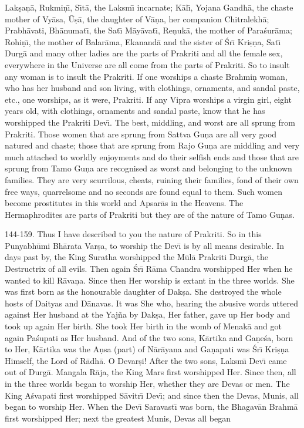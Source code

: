 Lak\d{s}a\d{n}\=a, Rukmi\d{n}\={\i}, S\={\i}t\=a, the Laksm\={\i} incarnate; K\=al\={\i}, Yojana Gandh\=a, the chaste mother of Vy\=asa, \=U\d{s}\=a, the daughter of V\=a\d{n}a, her companion Chitralekh\=a; Prabh\=avati, Bh\=anumat\={\i}, the Sat\={\i} M\=ay\=avat\={\i}, Re\d{n}uk\=a, the mother of Para\'sur\=ama; Rohi\d{n}\={\i}, the mother of Balar\=ama, Ekanand\=a and the sister of \'Sr\={\i} Kri\d{s}\d{n}a, Sat\={\i} Durg\=a and many other ladies are the parts of Prakriti and all the female sex, everywhere in the Universe are all come from the parts of Prakriti. So to insult any woman is to insult the Prakriti. If one worships a chaste Brahmi\d{n} woman, who has her husband and son living, with clothings, ornaments, and sandal paste, etc., one worships, as it were, Prakriti. If any Vipra worships a virgin girl, eight years old, with clothings, ornaments and sandal paste, know that he has worshipped the Prakriti Dev\={\i}. The best, middling, and worst are all sprung from Prakriti. Those women that are sprung from Sattva Gu\d{n}a are all very good natured and chaste; those that are sprung from Rajo Gu\d{n}a are middling and very much attached to worldly enjoyments and do their selfish ends and those that are sprung from Tamo Gu\d{n}a are recognised as worst and belonging to the unknown families. They are very scurrilous, cheats, ruining their families, fond of their own free ways, quarrelsome and no seconds are found equal to them. Such women become prostitutes in this world and Apsar\=as in the Heavens. The Hermaphrodites are parts of Prakriti but they are of the nature of Tamo Gu\d{n}as.

144-159. Thus I have described to you the nature of Prakriti. So in this Punyabh\=umi Bh\=arata Var\d{s}a, to worship the Dev\={\i} is by all means desirable. In days past by, the King Suratha worshipped the M\=ul\=a Prakriti Durg\=a, the Destructrix of all evils. Then again \'Sr\={\i} R\=ama Chandra worshipped Her when he wanted to kill R\=ava\d{n}a. Since then Her worship is extant in the three worlds. She was first born as the honourable daughter of Dak\d{s}a. She destroyed the whole hosts of Daityas and D\=anavas. It was She who, hearing the abusive words uttered against Her husband at the Yaj\~na by Dak\d{s}a, Her father, gave up Her body and took up again Her birth. She took Her birth in the womb of Menak\=a and got again Pa\'supati as Her husband. And of the two sons, K\=artika and Ga\d{n}e\'sa, born to Her, K\=artika was the A\d{n}sa (part) of N\=ar\=ayana and Ga\d{n}apati was \'Sr\={\i} Kri\d{s}\d{n}a Himself, the Lord of R\=adh\=a. O Devar\d{s}i! After the two sons, Laksm\={\i} Dev\={\i} came out of Durg\=a. Mangala R\=aja, the King Mars first worshipped Her. Since then, all in the three worlds began to worship Her, whether they are Devas or men. The King A\'svapati first worshipped S\=avitr\={\i} Dev\={\i}; and since then the Devas, Munis, all began to worship Her. When the Dev\={\i} Saravast\={\i} was born, the Bhagav\=an Brahm\=a first worshipped Her; next the greatest Munis, Devas all began

